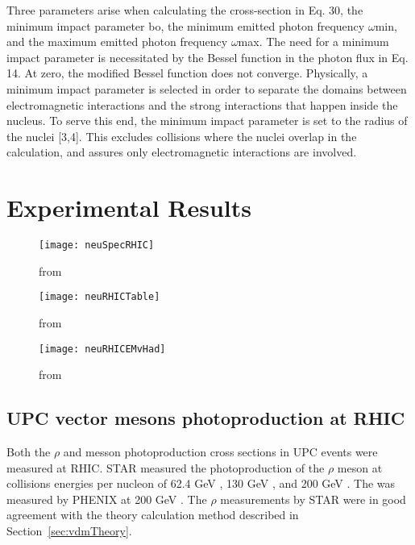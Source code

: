     Three parameters arise when calculating the cross-section in Eq.
    30, the minimum impact parameter bo, the minimum emitted photon frequency $\omega$min, and the maximum emitted photon frequency $\omega$max.
    The need for a minimum impact parameter is necessitated by the Bessel function in the photon flux in Eq.
    14.
    At zero, the modified Bessel function does not converge.
    Physically, a minimum impact parameter is selected in order to separate the domains between electromagnetic interactions and the strong interactions that happen inside the nucleus.
    To serve this end, the minimum impact parameter is set to the radius of the nuclei [3,4].
    This excludes collisions where the nuclei overlap in the calculation, and assures only electromagnetic interactions are involved.

  \section{Experimental Results}

  \begin{figure}[!Hhbt]
    \centering
    \texttt{[image: neuSpecRHIC]}
    \caption{from \cite{upcNeuPHENIX}}
    \label{fig:neuSpecRHIC}
  \end{figure}

  \begin{figure}[!Hhbt]
    \centering
    \texttt{[image: neuRHICTable]}
    \caption{from \cite{upcNeuPHENIX}}
    \label{fig:neuRHICTable}
  \end{figure}

  \begin{figure}[!Hhbt]
    \centering
    \texttt{[image: neuRHICEMvHad]}
    \caption{from \cite{upcNeuPHENIX}}
    \label{fig:neuRHICEMvHad}
  \end{figure}

    \subsection{ UPC vector mesons photoproduction at RHIC }
    
    Both the $\rho$ and \JPsi{} messon photoproduction cross sections in UPC 
      events were measured at RHIC.
    STAR measured the photoproduction of the $\rho$ meson at collisions 
      energies per nucleon of 62.4 GeV \cite{upcRhoSTAR12}, 130 GeV 
      \cite{upcRhoSTAR02}, and 200 GeV \cite{upcRhoSTAR08}. 
    The \JPsi{} was measured by PHENIX at 200 GeV \cite{upcJPsiPHENIX}.
    The $\rho$ measurements by STAR were in good agreement with the theory
      calculation method described in Section~\ref{sec:vdmTheory}.

